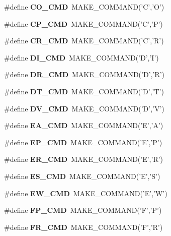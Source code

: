 \begin{DoxyCompactItemize}
\item 
\#define {\bfseries CO\_\-CMD}~MAKE\_\-COMMAND('C','O')\label{hpgsreader_8h_af27a4b2633fff72e19ff94548a9b80df}

\item 
\#define {\bfseries CP\_\-CMD}~MAKE\_\-COMMAND('C','P')\label{hpgsreader_8h_a020935f8642573a342d5a719dfa539aa}

\item 
\#define {\bfseries CR\_\-CMD}~MAKE\_\-COMMAND('C','R')\label{hpgsreader_8h_a2cc9d18b4fb56992239116e98636c937}

\item 
\#define {\bfseries DI\_\-CMD}~MAKE\_\-COMMAND('D','I')\label{hpgsreader_8h_a0af849564d5f967cb1a2939a60716735}

\item 
\#define {\bfseries DR\_\-CMD}~MAKE\_\-COMMAND('D','R')\label{hpgsreader_8h_a816e86a2c3fced4d09433f3a84f2fcc7}

\item 
\#define {\bfseries DT\_\-CMD}~MAKE\_\-COMMAND('D','T')\label{hpgsreader_8h_a93853a2689d035c7c4dc2097e8e3840d}

\item 
\#define {\bfseries DV\_\-CMD}~MAKE\_\-COMMAND('D','V')\label{hpgsreader_8h_a3cf7d74c1419fd9a739999372fbe107b}

\item 
\#define {\bfseries EA\_\-CMD}~MAKE\_\-COMMAND('E','A')\label{hpgsreader_8h_ae57c4b954849c48758f6e1ad1d9cf467}

\item 
\#define {\bfseries EP\_\-CMD}~MAKE\_\-COMMAND('E','P')\label{hpgsreader_8h_acd4fcdfc4e6dbfb398b37828554a6132}

\item 
\#define {\bfseries ER\_\-CMD}~MAKE\_\-COMMAND('E','R')\label{hpgsreader_8h_aa84400acb77816daef666ab03fc1d95d}

\item 
\#define {\bfseries ES\_\-CMD}~MAKE\_\-COMMAND('E','S')\label{hpgsreader_8h_ad14bc6ae8f5dc14439025f4154685c50}

\item 
\#define {\bfseries EW\_\-CMD}~MAKE\_\-COMMAND('E','W')\label{hpgsreader_8h_a05ccbfd46ce9c97f6918862c018a26a5}

\item 
\#define {\bfseries FP\_\-CMD}~MAKE\_\-COMMAND('F','P')\label{hpgsreader_8h_a01ad494f6c0ccf72b446e2a7ff1343fe}

\item 
\#define {\bfseries FR\_\-CMD}~MAKE\_\-COMMAND('F','R')\label{hpgsreader_8h_aa2c9b1dc809a17b6e0b1c5aa30861c56}


\end{DoxyCompactItemize}
